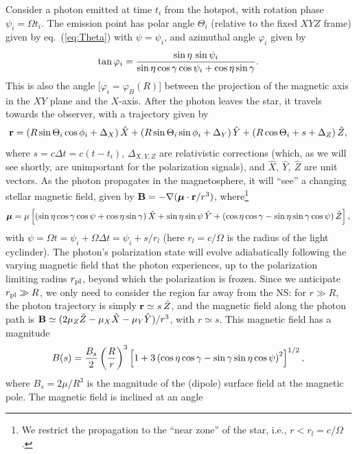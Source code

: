 \documentclass[useAMS,onecolumn,usenatbib,usegraphicx]{mn2e}
\def\be{\begin{equation}}
\def\ee{\end{equation}}
\begin{document}
Consider a photon emitted at time $t_i$ from the hotspot, with
rotation phase $\psi_i=\Omega t_i$. The emission point has 
polar angle $\Theta_i$ (relative to the fixed $XYZ$ frame)  given by
eq.~(\ref{eq:Theta}) with $\psi=\psi_i$, and azimuthal angle $\varphi_i$
given by 
\be 
\tan\varphi_i={\sin\eta\,\sin\psi_i\over
\sin\eta\cos\gamma\cos\psi_i+\cos\eta \sin\gamma}.  
\label{eq:phii}\ee 
This is also the angle [$\varphi_i=\varphi_B(R)$]
between the projection of the magnetic axis in the $XY$ plane
and the $X$-axis. After the photon leaves the star,
it travels towards the observer, with a trajectory given by 
\be 
{\bf r}=(R\sin\Theta_i\cos\phi_i+\Delta_X)\,{\hat X}+(R\sin\Theta_i\sin\phi_i
+\Delta_Y)\,{\hat Y}+(R\cos\Theta_i+s+\Delta_Z)\,{\hat Z}, 
\ee 
where $s=c\Delta t=c(t-t_i)$, $\Delta_{X,Y,Z}$ are relativistic
corrections (which, as we will see shortly, are unimportant 
for the polarization signals), and $\hat X,~\hat Y,~\hat Z$ are unit vectors.
As the photon propagates in the magnetosphere, it will
``see'' a changing stellar magnetic field,
given by ${\bf B}=-\nabla ({\mbox{\boldmath $\mu$}}\cdot{\bf r}/r^3)$, where\footnote{We restrict the
propagation to the ``near zone'' of the star, i.e., $r<r_l=c/\Omega$.}
\be
\bmu=\mu\left[(\sin\eta\cos\gamma\cos\psi+\cos\eta\sin\gamma)\,{\hat X}
+\sin\eta\sin\psi \,{\hat Y}+(\cos\eta\cos\gamma-\sin\eta\sin\gamma\cos\psi) 
\,{\hat Z}\right],
\ee with $\psi=\Omega t=\psi_i+\Omega\Delta t=\psi_i+s/r_l$ (here
$r_l=c/\Omega$ is the radius of the light cyclinder).  The photon's
polarization state will evolve adiabatically following the varying
magnetic field that the photon experiences, up to the polarization
limiting radius $r_{\rm pl}$, beyond which the polarization is frozen.
Since we anticipate $r_{\rm pl}\gg R$, we only need to consider the region
far away from the NS: for $r\gg R$, the photon trajectory is
simply ${\bf r}\simeq s\,{\hat Z}$, and the magnetic field along the
photon path is ${\bf B}\simeq (2\mu_Z{\hat Z}-\mu_X{\hat X}-\mu_Y{\hat
Y})/r^3$, with $r\simeq s$. This magnetic field has a magnitude
\begin{eqnarray}
\label{eq:BMag}
B(s)={B_s\over 2}\left({R\over r}\right)^3\left[1+3
\left(\cos\eta\cos\gamma-\sin\gamma\sin\eta\cos\psi\right)^2\right]^{1/2},
\end{eqnarray}
where $B_s=2\mu/R^3$ is the magnitude of the (dipole) surface field at the 
magnetic pole.
The magnetic field is inclined at an angle
\end{document}
